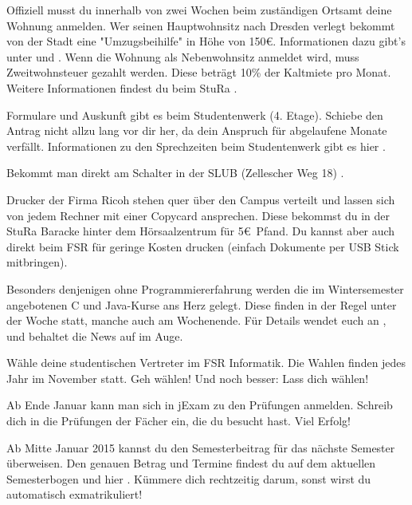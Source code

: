 Offiziell musst du innerhalb von zwei Wochen beim zuständigen Ortsamt  deine Wohnung anmelden.
Wer seinen Hauptwohnsitz nach Dresden verlegt bekommt von der Stadt eine "Umzugsbeihilfe" in Höhe von 150\euro.
Informationen dazu gibt's unter  und .
Wenn die Wohnung als Nebenwohnsitz anmeldet wird, muss Zweitwohnsteuer gezahlt werden. Diese beträgt 10\% der Kaltmiete pro Monat. Weitere Informationen findest du beim StuRa .

Formulare und Auskunft gibt es beim Studentenwerk (4. Etage).
Schiebe den Antrag nicht allzu lang vor dir her, da dein Anspruch für abgelaufene Monate verfällt.
Informationen zu den Sprechzeiten beim Studentenwerk gibt es hier .

Bekommt man direkt am Schalter in der SLUB (Zellescher Weg 18) .

Drucker der Firma Ricoh stehen quer über den Campus verteilt und lassen sich von jedem Rechner mit einer Copycard ansprechen.
Diese bekommst du in der StuRa Baracke hinter dem Hörsaalzentrum für 5\euro\ Pfand. Du kannst aber auch direkt beim FSR für geringe Kosten drucken (einfach Dokumente per USB Stick mitbringen).

Besonders denjenigen ohne Programmiererfahrung werden die im Wintersemester angebotenen C und Java-Kurse ans Herz gelegt.
Diese finden in der Regel unter der Woche statt, manche auch am Wochenende.
Für Details wendet euch an ,  und behaltet die News auf  im Auge.

Wähle deine studentischen Vertreter im FSR Informatik.
Die Wahlen finden jedes Jahr im November statt.
Geh wählen!
Und noch besser: Lass dich wählen!

Ab Ende Januar kann man sich in jExam zu den Prüfungen anmelden.
Schreib dich in die Prüfungen der Fächer ein, die du besucht hast.
Viel Erfolg!

Ab Mitte Januar 2015 kannst du den Semesterbeitrag für das nächste Semester überweisen.
Den genauen Betrag und Termine findest du auf dem aktuellen Semesterbogen und hier .
Kümmere dich rechtzeitig darum, sonst wirst du automatisch exmatrikuliert!


